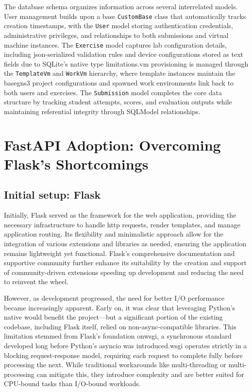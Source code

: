             The database schema organizes information across several interrelated models. User management builds upon a base \texttt{CustomBase} class 
            that automatically tracks creation timestamps, with the \texttt{User} model storing authentication credentials, administrative privileges, 
            and relationships to both submissions and virtual machine instances. The \texttt{Exercise} model captures lab configuration details, including 
            \ac{json}-serialized validation rules and device configurations stored as text fields due to SQLite's native type limitations.\ac{vm} 
            provisioning is managed through the \texttt{TemplateVm} and \texttt{WorkVm} hierarchy, where template instances maintain the base\ac{gns3} 
            project configurations and spawned work environments link back to both users and exercises. The \texttt{Submission} model completes the 
            core data structure by tracking student attempts, scores, and evaluation outputs while maintaining referential integrity through SQLModel 
            relationships.

\section{FastAPI Adoption: Overcoming Flask's Shortcomings}

    \subsection{Initial setup: Flask}

        Initially, Flask served as the framework for the web application, providing the necessary infrastructure to handle \ac{http} 
        requests, render templates, and manage application routing. Its flexibility and minimalistic approach allow for the 
        integration of various extensions and libraries as needed, ensuring the application remains lightweight yet functional. 
        Flask's comprehensive documentation and supportive community further enhance its suitability by the creation and support
        of community-driven extensions speeding up development and reducing the need to reinvent the wheel.

        However, as development progressed, the need for better I/O performance became increasingly apparent. Early on, it was 
        clear that leveraging Python's native  would benefit the project—but a significant portion of the existing codebase, 
        including Flask itself, relied on non-async-compatible libraries. This limitation stemmed from Flask's foundation on\ac{wsgi}, a 
        synchronous standard developed long before Python's asyncio was introduced.\ac{wsgi} operates strictly in a blocking request-response 
        model, requiring each request to complete fully before processing the next. While traditional workarounds like multi-threading 
        or multi-processing can mitigate this, they introduce complexity and are better suited for CPU-bound tasks than I/O-bound workloads.

